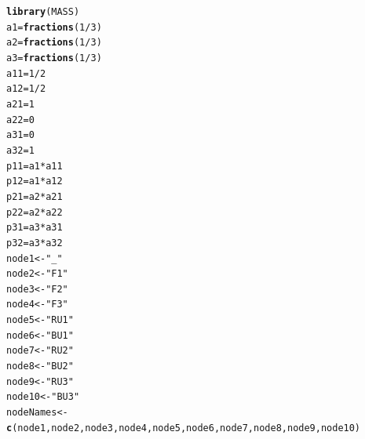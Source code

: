 \documentclass[onecolumn,12pt]{book}\usepackage[]{graphicx}\usepackage[]{color}
\makeatletter
\newcommand{\hlnum}[1]{\textcolor[rgb]{0.686,0.059,0.569}{#1}}%
\newcommand{\hlstr}[1]{\textcolor[rgb]{0.192,0.494,0.8}{#1}}%
\newcommand{\hlopt}[1]{\textcolor[rgb]{0,0,0}{#1}}%
\newcommand{\hlstd}[1]{\textcolor[rgb]{0.345,0.345,0.345}{#1}}%
\newcommand{\hlkwb}[1]{\textcolor[rgb]{0.69,0.353,0.396}{#1}}%
\newcommand{\hlkwd}[1]{\textcolor[rgb]{0.737,0.353,0.396}{\textbf{#1}}}%
\newenvironment{kframe}{%
 \def\at@end@of@kframe{}%
 \ifinner\ifhmode%
  \def\at@end@of@kframe{\end{minipage}}%
  \begin{minipage}{\columnwidth}%
 \fi\fi%
 \def\FrameCommand##1{\hskip\@totalleftmargin \hskip-\fboxsep
 \colorbox{shadecolor}{##1}\hskip-\fboxsep
     \hskip-\linewidth \hskip-\@totalleftmargin \hskip\columnwidth}%
 \MakeFramed {\advance\hsize-\width
   \@totalleftmargin\z@ \linewidth\hsize
   \@setminipage}}%
 {\par\unskip\endMakeFramed%
 \at@end@of@kframe}
\newenvironment{knitrout}{}{} %
\makeatother
\begin{document}
\begin{knitrout}
\color{fgcolor}\begin{kframe}
\begin{alltt}
\hlkwd{library}\hlstd{(MASS)}
\hlstd{a1}\hlkwb{=}\hlkwd{fractions}\hlstd{(}\hlnum{1}\hlopt{/}\hlnum{3}\hlstd{)}
\hlstd{a2}\hlkwb{=}\hlkwd{fractions}\hlstd{(}\hlnum{1}\hlopt{/}\hlnum{3}\hlstd{)}
\hlstd{a3}\hlkwb{=}\hlkwd{fractions}\hlstd{(}\hlnum{1}\hlopt{/}\hlnum{3}\hlstd{)}
\hlstd{a11}\hlkwb{=}\hlnum{1}\hlopt{/}\hlnum{2}
\hlstd{a12}\hlkwb{=}\hlnum{1}\hlopt{/}\hlnum{2}
\hlstd{a21}\hlkwb{=}\hlnum{1}
\hlstd{a22}\hlkwb{=}\hlnum{0}
\hlstd{a31}\hlkwb{=}\hlnum{0}
\hlstd{a32}\hlkwb{=}\hlnum{1}
\hlstd{p11}\hlkwb{=}\hlstd{a1}\hlopt{*}\hlstd{a11}
\hlstd{p12}\hlkwb{=}\hlstd{a1}\hlopt{*}\hlstd{a12}
\hlstd{p21}\hlkwb{=}\hlstd{a2}\hlopt{*}\hlstd{a21}
\hlstd{p22}\hlkwb{=}\hlstd{a2}\hlopt{*}\hlstd{a22}
\hlstd{p31}\hlkwb{=}\hlstd{a3}\hlopt{*}\hlstd{a31}
\hlstd{p32}\hlkwb{=}\hlstd{a3}\hlopt{*}\hlstd{a32}
\hlstd{node1}\hlkwb{<-}\hlstr{"_"}
\hlstd{node2}\hlkwb{<-}\hlstr{"F1"}
\hlstd{node3}\hlkwb{<-}\hlstr{"F2"}
\hlstd{node4}\hlkwb{<-}\hlstr{"F3"}
\hlstd{node5}\hlkwb{<-}\hlstr{"RU1"}
\hlstd{node6}\hlkwb{<-}\hlstr{"BU1"}
\hlstd{node7}\hlkwb{<-}\hlstr{"RU2"}
\hlstd{node8}\hlkwb{<-}\hlstr{"BU2"}
\hlstd{node9}\hlkwb{<-}\hlstr{"RU3"}
\hlstd{node10}\hlkwb{<-}\hlstr{"BU3"}
\hlstd{nodeNames}\hlkwb{<-}\hlkwd{c}\hlstd{(node1,node2,node3,node4, node5,node6, node7,node8,node9,node10)}


\end{alltt}
\end{kframe}
\end{knitrout}
\end{document}
